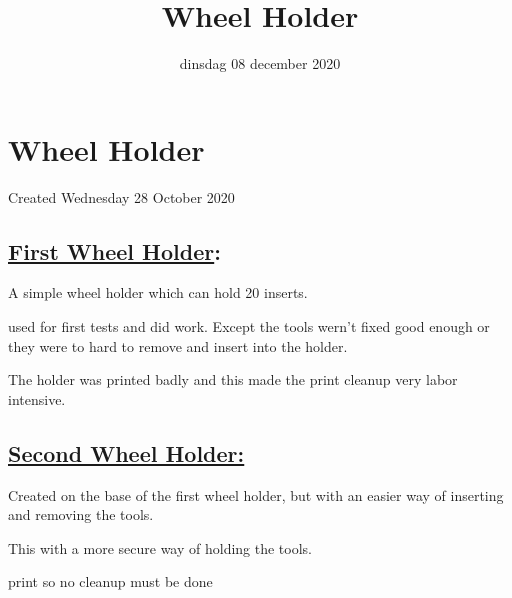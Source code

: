 \documentclass{scrartcl}
\title{Wheel Holder}
\date{dinsdag 08 december 2020}
\author{}
\begin{document}
\maketitle

		\section{Wheel Holder}

Created Wednesday 28 October 2020



\subsection{\href{./Wheel_Holder/first_wheel_holder.tex}{First Wheel Holder}:}

A simple wheel holder which can hold 20 inserts.

used for first tests and did work. Except the tools wern't fixed good enough or they were to hard to remove and insert into the holder.

The holder was printed badly and this made the print cleanup very labor intensive. 



\subsection{\href{./Wheel_Holder/Second_Wheel_Holder.tex}{Second Wheel Holder:}}

Created on the base of the first wheel holder, but with an easier way of inserting and removing the tools. 

This with a more secure way of holding the tools. 

print so no cleanup must be done
\end{document}
